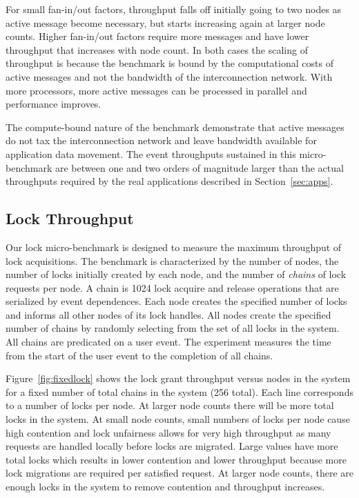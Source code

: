 For small fan-in/out factors, throughput falls off initially going to two nodes as active
message become necessary, but starts increasing again at larger node counts.  Higher
fan-in/out factors require more messages and have lower throughput that increases with
node count.  In both cases the scaling of throughput is because the benchmark is
bound by the computational costs of active messages and not the bandwidth of the
interconnection network.  With more processors, more active messages can be processed
in parallel and performance improves.  

The compute-bound nature of the benchmark demonstrate that active messages do not tax 
the interconnection network and leave bandwidth available for application data movement.  
The event throughputs sustained in this micro-benchmark are between one and two orders
of magnitude larger than the actual throughputs required by the real applications
described in Section~\ref{sec:apps}.

\subsection{Lock Throughput}
\label{subsec:lockmicro}
Our lock micro-benchmark is designed to measure the maximum throughput of lock
acquisitions.  The benchmark is characterized by the number of nodes, the number
of locks initially created by each node, and the number of {\em chains} of
lock requests per node.  A chain is 1024 lock acquire and release operations that
are serialized by event dependences.  Each node creates the specified number of locks and
informs all other nodes of its lock handles.  All nodes create the specified number
of chains by randomly selecting from the set of all locks in the system.  All chains
are predicated on a user event.  The experiment measures the time from the start of
the user event to the completion of all chains.

Figure~\ref{fig:fixedlock} shows the lock grant throughput versus nodes in the system
for a fixed number of total chains in the system (256 total).  Each line corresponds
to a number of locks per node.  At larger node counts there will be more total locks
in the system.  At small node counts, small numbers of locks per node cause high
contention and lock unfairness allows for very high throughput as many requests are
handled locally before locks are migrated.  Large values have more total locks which
results in lower contention and lower throughput because more lock migrations are
required per satisfied request.  At larger node counts, there are enough locks
in the system to remove contention and throughput increases.

